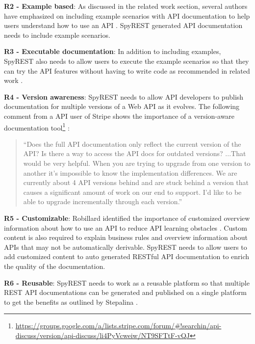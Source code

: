 \documentclass[conference]{IEEEtran}
\begin{document}
  \textbf{R2 - Example based}: As discussed in the related work section, several authors have emphasized on including example scenarios with API documentation to help users understand how to use an API \cite{Robillard_what_makes} \cite{Kuhn_on_designing} \cite{Hoffman_api_documentation} \cite{Nasehi_what_makes}. SpyREST generated API documentation needs to include example scenarios.

  \textbf{R3 - Executable documentation}: In addition to including examples, SpyREST also needs to allow users to execute the example scenarios so that they can try the API features without having to write code as recommended in related work \cite{Hoffman_api_documentation} \cite{Myers_study}.

  \textbf{R4 - Version awareness}: SpyREST needs to allow API developers to publish documentation for multiple versions of a Web API as it evolves. The following comment from a API user of Stripe shows the importance of a version-aware documentation tool\footnote{\url{https://groups.google.com/a/lists.stripe.com/forum/#!searchin/api-discuss/version/api-discuss/li4PyVcweiw/NT9SFTtF-vQJ}}
:
  \small
  \begin{quotation}
   ``Does the full API documentation only reflect the current version of the
    API?  Is there a way to access the API docs for outdated versions? ...That would be very helpful. When you are trying to upgrade from one version to another it's impossible to know the implementation differences. We are currently about 4 API versions behind and are stuck behind a version that causes a significant amount of work on our end to support. I'd like to be able to upgrade incrementally through each version.''
  \end{quotation}
  \normalsize

  \textbf{R5 - Customizable}: Robillard identified the importance of customized overview information about how to use an API to reduce API learning obstacles \cite{Robillard_what_makes}. Custom content is also required to explain business rules and overview information about APIs that may not be automatically derivable. SpyREST needs to allow users to add customized content to auto generated RESTful API documentation to enrich the quality of the documentation.

  \textbf{R6 - Reusable}: SpyREST needs to work as a reusable platform so that multiple REST API documentations can be generated and published on a single platform to get the benefits as outlined by Stepalina \cite{Stepalina_saas}.
\end{document}
